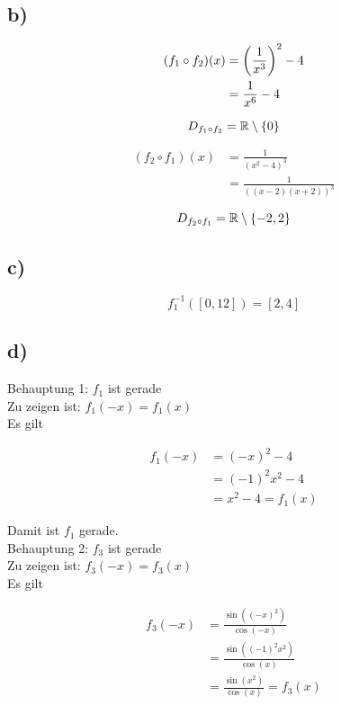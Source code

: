 \documentclass[a4paper, 11pt]{article}
\begin{document}
\subsection{b)}
\label{sec:org7e39c86}
\begin{align*}
    (f_1 \circ f_2)(x) &= \left(\frac{1}{x^3}\right)^2 - 4 \\
    &= \frac{1}{x^6} - 4
\end{align*}

$$ D_{f_1 \circ f_2} = \mathbb{R} \setminus \{0\} $$

\begin{align*}
    (f_2 \circ f_1)(x) &= \frac{1}{(x^2 - 4)^3} \\
    &= \frac{1}{((x - 2)(x + 2))^3}
\end{align*}

$$ D_{f_2 \circ f_1} = \mathbb{R} \setminus \{-2, 2\} $$

\subsection{c)}
\label{sec:org7ea89d0}
$$ f_{1}^{-1}([0, 12]) = [2, 4] $$

\subsection{d)}
\label{sec:orgc55360b}
Behauptung 1: \(f_1\) ist gerade \\

Zu zeigen ist: \(f_1(-x) = f_1(x)\) \\
Es gilt

\begin{align*}
    f_1(-x) &= (-x)^2 - 4 \\
    &= (-1)^2 x^2 - 4 \\
    &= x^2 - 4 = f_1(x)
\end{align*}

Damit ist \(f_1\) gerade. \\


Behauptung 2: \(f_3\) ist gerade \\

Zu zeigen ist: \(f_3(-x) = f_3(x)\) \\
Es gilt

\begin{align*}
    f_3(-x) &= \frac{\sin((-x)^2)}{\cos(-x)} \\
    &= \frac{\sin((-1)^2 x^2)}{\cos(x)} \\
    &= \frac{\sin(x^2)}{\cos(x)} = f_3(x) \\
\end{align*}
\end{document}
